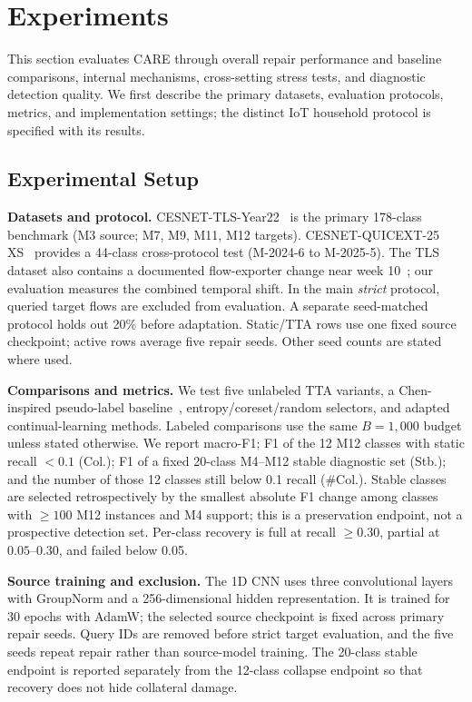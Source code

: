 \documentclass[journal]{IEEEtran}
\newcommand{\ours}{CARE}  %
\begin{document}
\section{Experiments}
\label{sec:experiments}

This section evaluates \ours{} through overall repair performance and baseline comparisons, internal mechanisms, cross-setting stress tests, and diagnostic detection quality. We first describe the primary datasets, evaluation protocols, metrics, and implementation settings; the distinct IoT household protocol is specified with its results.

\subsection{Experimental Setup}
\label{sec:exp_setup}


\textbf{Datasets and protocol.} CESNET-TLS-Year22~\cite{hynek2024cesnet} is the primary 178-class benchmark (M3 source; M7, M9, M11, M12 targets). CESNET-QUICEXT-25 XS~\cite{cesnetquicext25,mucke2025waiting} provides a 44-class cross-protocol test (M-2024-6 to M-2025-5). The TLS dataset also contains a documented flow-exporter change near week 10~\cite{hynek2024cesnet}; our evaluation measures the combined temporal shift. In the main \textit{strict} protocol, queried target flows are excluded from evaluation. A separate seed-matched protocol holds out 20\% before adaptation. Static/TTA rows use one fixed source checkpoint; active rows average five repair seeds. Other seed counts are stated where used.

\textbf{Comparisons and metrics.} We test five unlabeled TTA variants, a Chen-inspired pseudo-label baseline~\cite{chen2025selfevolving}, entropy/coreset/random selectors, and adapted continual-learning methods. Labeled comparisons use the same $B=1{,}000$ budget unless stated otherwise. We report macro-F1; F1 of the 12 M12 classes with static recall $<0.1$ (Col.); F1 of a fixed 20-class M4--M12 stable diagnostic set (Stb.); and the number of those 12 classes still below 0.1 recall (\#Col.). Stable classes are selected retrospectively by the smallest absolute F1 change among classes with $\geq100$ M12 instances and M4 support; this is a preservation endpoint, not a prospective detection set. Per-class recovery is full at recall $\geq0.30$, partial at $0.05$--$0.30$, and failed below 0.05.

\textbf{Source training and exclusion.} The 1D CNN uses three convolutional layers with GroupNorm and a 256-dimensional hidden representation. It is trained for 30 epochs with AdamW; the selected source checkpoint is fixed across primary repair seeds. Query IDs are removed before strict target evaluation, and the five seeds repeat repair rather than source-model training. The 20-class stable endpoint is reported separately from the 12-class collapse endpoint so that recovery does not hide collateral damage.
\end{document}
